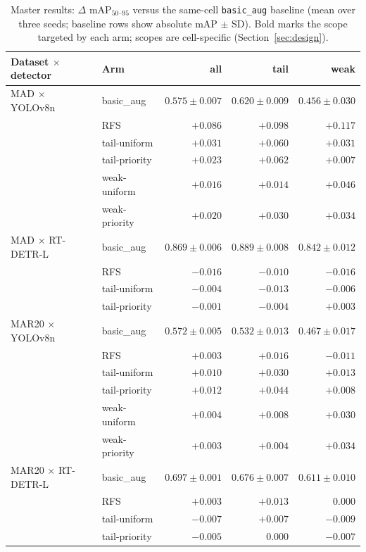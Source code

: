 \documentclass[preprint,12pt,authoryear]{elsarticle}
\newcommand{\mapm}{mAP\(_{50\text{--}95}\)}
\begin{document}
\begin{table}[t]
\centering
\caption{Master results: $\Delta$ \mapm{} versus the same-cell
\texttt{basic\_aug} baseline (mean over three seeds; baseline rows show
absolute mAP $\pm$ SD). Bold marks the scope targeted by each arm;
scopes are cell-specific (Section~\ref{sec:design}).}
\label{tab:master}
\small
\begin{tabular}{llrrr}
\toprule
Dataset $\times$ detector & Arm & all & tail & weak \\
\midrule
MAD $\times$ YOLOv8n
  & basic\_aug    & $0.575\pm0.007$ & $0.620\pm0.009$ & $0.456\pm0.030$ \\
  & RFS           & $+0.086$ & $+0.098$ & $+0.117$ \\
  & tail-uniform  & $+0.031$ & $\mathbf{+0.060}$ & $+0.031$ \\
  & tail-priority & $+0.023$ & $\mathbf{+0.062}$ & $+0.007$ \\
  & weak-uniform  & $+0.016$ & $+0.014$ & $\mathbf{+0.046}$ \\
  & weak-priority & $+0.020$ & $+0.030$ & $\mathbf{+0.034}$ \\
\midrule
MAD $\times$ RT-DETR-L
  & basic\_aug    & $0.869\pm0.006$ & $0.889\pm0.008$ & $0.842\pm0.012$ \\
  & RFS           & $-0.016$ & $-0.010$ & $-0.016$ \\
  & tail-uniform  & $-0.004$ & $\mathbf{-0.013}$ & $-0.006$ \\
  & tail-priority & $-0.001$ & $\mathbf{-0.004}$ & $+0.003$ \\
\midrule
MAR20 $\times$ YOLOv8n
  & basic\_aug    & $0.572\pm0.005$ & $0.532\pm0.013$ & $0.467\pm0.017$ \\
  & RFS           & $+0.003$ & $+0.016$ & $-0.011$ \\
  & tail-uniform  & $+0.010$ & $\mathbf{+0.030}$ & $+0.013$ \\
  & tail-priority & $+0.012$ & $\mathbf{+0.044}$ & $+0.008$ \\
  & weak-uniform  & $+0.004$ & $+0.008$ & $\mathbf{+0.030}$ \\
  & weak-priority & $+0.003$ & $+0.004$ & $\mathbf{+0.034}$ \\
\midrule
MAR20 $\times$ RT-DETR-L
  & basic\_aug    & $0.697\pm0.001$ & $0.676\pm0.007$ & $0.611\pm0.010$ \\
  & RFS           & $+0.003$ & $+0.013$ & $0.000$ \\
  & tail-uniform  & $-0.007$ & $\mathbf{+0.007}$ & $-0.009$ \\
  & tail-priority & $-0.005$ & $\mathbf{0.000}$  & $-0.007$ \\
\bottomrule
\end{tabular}
\end{table}
\end{document}
